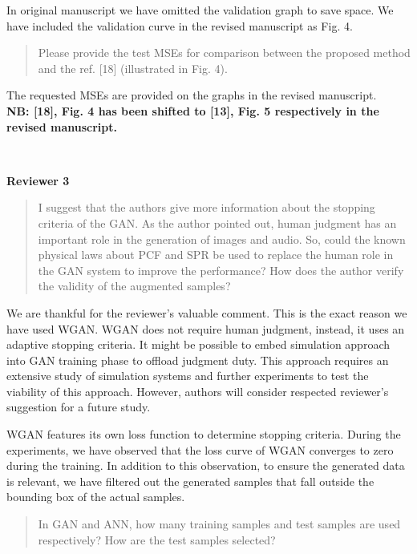 \documentclass{article}
\begin{document}
	In original manuscript we have omitted the validation graph to save space. We have included the validation curve in the revised manuscript as Fig. 4.
	
	\begin{quote}
	Please provide the test MSEs for comparison between the proposed method and the ref. [18] (illustrated in Fig. 4).
	\end{quote}
	
	The requested MSEs are provided on the graphs in the revised manuscript. \\
	
	\textbf{NB: [18], Fig. 4 has been shifted to [13], Fig. 5 respectively in the revised manuscript.}
	
	~
	
	{\bfseries\large Reviewer 3}
	
	\begin{quote}
	I suggest that the authors give more information about the stopping criteria of the GAN. As the author pointed out, human judgment has an important role in the generation of images and audio. So, could the known physical laws about PCF and SPR be used to replace the human role in the GAN system to improve the performance? How does the author verify the validity of the augmented samples?
	\end{quote}
	
	We are thankful for the reviewer's valuable comment. This is the exact reason we have used WGAN. WGAN does not require human judgment, instead, it uses an adaptive stopping criteria. It might be possible to embed simulation approach into GAN training phase to offload judgment duty. This approach requires an extensive study of simulation systems and further experiments to test the viability of this approach. However, authors will consider respected reviewer's suggestion for a future study.
	
	WGAN features its own loss function to determine stopping criteria. During the experiments, we have observed that the loss curve of WGAN converges to zero during the training. In addition to this observation, to ensure the generated data is relevant, we have filtered out the generated samples that fall outside the bounding box of the actual samples.
	
	\begin{quote}
	 In GAN and ANN, how many training samples and test samples are used respectively? How are the test samples selected?
	\end{quote}
	
\end{document}
